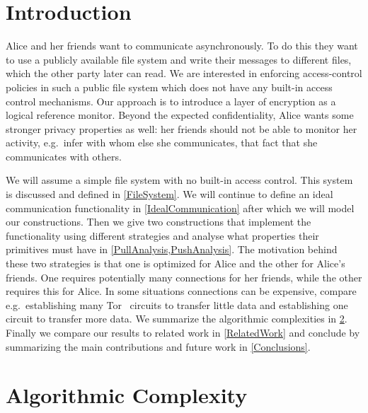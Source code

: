 \acresetall{}
\section{Introduction}\label{Introduction}

Alice and her friends want to communicate asynchronously.
To do this they want to use a publicly available file system and write their 
messages to different files, which the other party later can read.
We are interested in enforcing access-control policies in such a public file 
system which does not have any built-in access control mechanisms.
Our approach is to introduce a layer of encryption as a logical reference 
monitor.
Beyond the expected confidentiality, Alice wants some stronger privacy 
properties as well: her friends should not be able to monitor her activity, 
e.g.\ infer with whom else she communicates, that fact that she communicates 
with others.

We will assume a simple file system with no built-in access control.
This system is discussed and defined in \cref{FileSystem}.
We will continue to define an ideal communication functionality in 
\cref{IdealCommunication} after which we will model our constructions.
Then we give two constructions that implement the functionality using different 
strategies and analyse what properties their primitives must have in 
\cref{PullAnalysis,PushAnalysis}.
The motivation behind these two strategies is that one is optimized for Alice 
and the other for Alice's friends.
One requires potentially many connections for her friends, while the other 
requires this for Alice.
In some situations connections can be expensive, compare e.g.\ establishing 
many Tor~\cite{Tor} circuits to transfer little data and establishing one 
circuit to transfer more data.
We summarize the algorithmic complexities in \cref{AlgComplexity}.
Finally we compare our results to related work in \cref{RelatedWork} and 
conclude by summarizing the main contributions and future work in 
\cref{Conclusions}.








\section{Algorithmic Complexity}\label{AlgComplexity}

